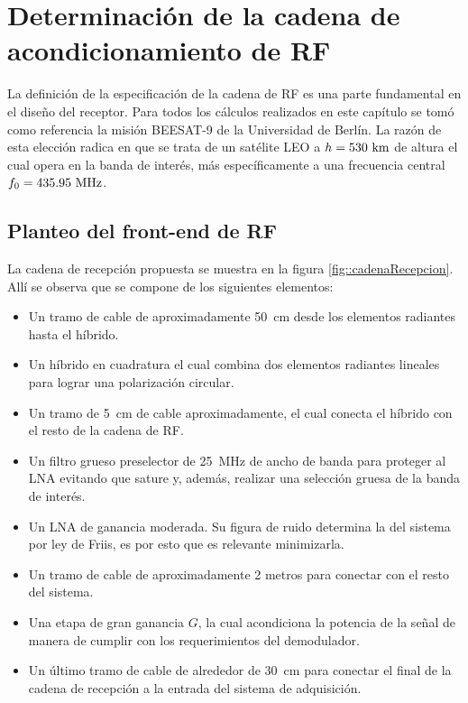 \documentclass[../../main.tex]{subfiles}
\begin{document}
\graphicspath{{./figures}}
\chapter{Determinación de la cadena de acondicionamiento de RF}

La definición de la especificación de la cadena de RF es una parte fundamental en el diseño del receptor. Para todos los cálculos realizados en este capítulo se tomó como referencia la misión BEESAT-9 \cite{BEESAT-9} de la Universidad de Berlín. La razón de esta elección radica en que se trata de un satélite LEO a $h = 530~\textrm{km}$ de altura el cual opera en la banda de interés, más específicamente a una frecuencia central $f_0 = 435.95~\textrm{MHz}$.

\section{Planteo del front-end de RF}
La cadena de recepción propuesta se muestra en la figura \ref{fig::cadenaRecepcion}. Allí se observa que se compone de los siguientes elementos:
\begin{itemize}
    \item Un tramo de cable de aproximadamente 50~cm desde los elementos radiantes hasta el híbrido.
    \item Un híbrido en cuadratura el cual combina dos elementos radiantes lineales para lograr una polarización circular.
    \item Un tramo de 5~cm de cable aproximadamente, el cual conecta el híbrido con el resto de la cadena de RF.
    \item Un filtro grueso preselector de 25~MHz de ancho de banda para proteger al LNA evitando que sature y, además, realizar una selección gruesa de la banda de interés.
    \item Un LNA de ganancia moderada. Su figura de ruido determina la del sistema por ley de Friis, es por esto que es relevante minimizarla.
    \item Un tramo de cable de aproximadamente 2 metros para conectar con el resto del sistema.
    \item Una etapa de gran ganancia $G$, la cual acondiciona la potencia de la señal de manera de cumplir con los requerimientos del demodulador.
    \item Un último tramo de cable de alrededor de 30~cm para conectar el final de la cadena de recepción a la entrada del sistema de adquisición.
\end{itemize}
\end{document}
